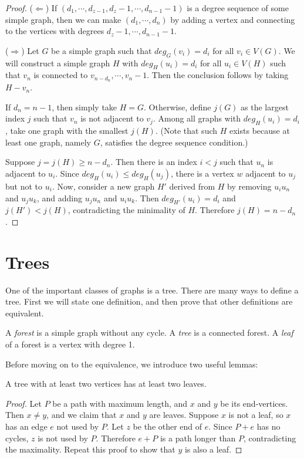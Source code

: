         \begin{proof}
            ($\Leftarrow$) If $(d_1,\cdots,d_{z-1},d_z-1,\cdots,d_{n-1}-1)$ is a degree sequence of some simple graph, then we can make $(d_1,\cdots,d_n)$ by adding a vertex and connecting to the vertices with degrees $d_z-1,\cdots,d_{n-1}-1$.
            
            ($\Rightarrow$) Let $G$ be a simple graph such that $deg_G(v_i)=d_i$ for all $v_i \in V(G)$. We will construct a simple graph $H$ with $deg_H(u_i)=d_i$ for all $u_i \in V(H)$ such that $v_n$ is connected to $v_{n-d_n},\cdots,v_n-1$. Then the conclusion follows by taking $H-v_n$.
            
            If $d_n=n-1$, then simply take $H=G$. Otherwise, define $j(G)$ as the largest index $j$ such that $v_n$ is not adjacent to $v_j$. Among all graphs with $deg_H(u_i)=d_i$, take one graph with the smallest $j(H)$. (Note that such $H$ exists because at least one graph, namely $G$, satisfies the degree sequence condition.)
            
            Suppose $j=j(H) \geq n-d_n$. Then there is an index $i<j$ such that $u_n$ is adjacent to $u_i$. Since $deg_H(u_i) \leq deg_H(u_j)$, there is a vertex $w$ adjacent to $u_j$ but not to $u_i$. Now, consider a new graph $H'$ derived from $H$ by removing $u_iu_n$ and $u_ju_k$, and adding $u_ju_n$ and $u_iu_k$. Then $deg_{H'}(u_i)=d_i$ and $j(H')<j(H)$, contradicting the minimality of $H$. Therefore $j(H) = n-d_n$.
        \end{proof}
    
    \section{Trees}
        One of the important classes of graphs is a tree. There are many ways to define a tree. First we will state one definition, and then prove that other definitions are equivalent.
        \begin{defn}[Tree] \label{def_tree}
            A \emph{forest} is a simple graph without any cycle. A \emph{tree} is a connected forest. A \emph{leaf} of a forest is a vertex with degree 1.
        \end{defn}
        
        Before moving on to the equivalence, we introduce two useful lemmas:
        
        \begin{lemma} \label{lem_tree_leaf}
            A tree with at least two vertices has at least two leaves.
        \end{lemma}
        \begin{proof}
            Let $P$ be a path with maximum length, and $x$ and $y$ be its end-vertices. Then $x \neq y$, and we claim that $x$ and $y$ are leaves. Suppose $x$ is not a leaf, so $x$ has an edge $e$ not used by $P$. Let $z$ be the other end of $e$. Since $P+e$ has no cycles, $z$ is not used by $P$. Therefore $e+P$ is a path longer than $P$, contradicting the maximality. Repeat this proof to show that $y$ is also a leaf.
        \end{proof}
        
